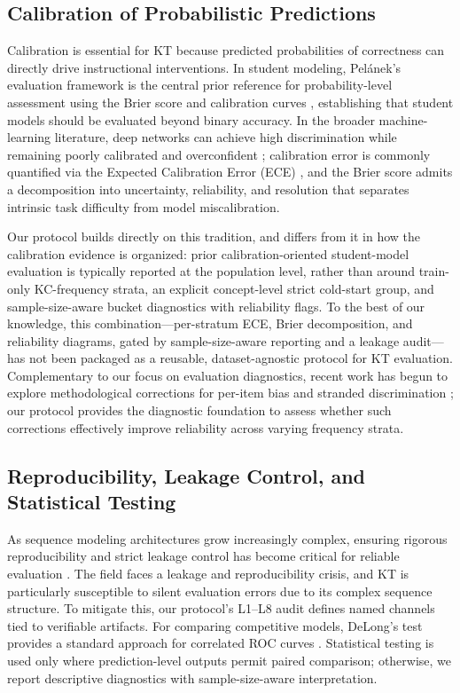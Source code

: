 \subsection{Calibration of Probabilistic Predictions}
Calibration is essential for KT because predicted probabilities of correctness can directly drive instructional interventions. In student modeling, Pel\'{a}nek's evaluation framework is the central prior reference for probability-level assessment using the Brier score and calibration curves \citep{pelanek2015metrics}, establishing that student models should be evaluated beyond binary accuracy. In the broader machine-learning literature, deep networks can achieve high discrimination while remaining poorly calibrated and overconfident \citep{guo2017calibration}; calibration error is commonly quantified via the Expected Calibration Error (ECE) \citep{naeini2015obtaining}, and the Brier score \citep{brier1950verification} admits a decomposition into uncertainty, reliability, and resolution \citep{degroot1983comparison} that separates intrinsic task difficulty from model miscalibration.

Our protocol builds directly on this tradition, and differs from it in how the calibration evidence is organized: prior calibration-oriented student-model evaluation is typically reported at the population level, rather than around train-only KC-frequency strata, an explicit concept-level strict cold-start group, and sample-size-aware bucket diagnostics with reliability flags. To the best of our knowledge, this combination---per-stratum ECE, Brier decomposition, and reliability diagrams, gated by sample-size-aware reporting and a leakage audit---has not been packaged as a reusable, dataset-agnostic protocol for KT evaluation. Complementary to our focus on evaluation diagnostics, recent work has begun to explore methodological corrections for per-item bias and stranded discrimination \citep{yan2026recovering}; our protocol provides the diagnostic foundation to assess whether such corrections effectively improve reliability across varying frequency strata.

\subsection{Reproducibility, Leakage Control, and Statistical Testing}
As sequence modeling architectures grow increasingly complex, ensuring rigorous reproducibility and strict leakage control has become critical for reliable evaluation \citep{kapoor2023leakage, gervet2020deep, kim2026ensuring}. The field faces a leakage and reproducibility crisis, and KT is particularly susceptible to silent evaluation errors due to its complex sequence structure. To mitigate this, our protocol's L1--L8 audit defines named channels tied to verifiable artifacts. For comparing competitive models, DeLong's test provides a standard approach for correlated ROC curves \citep{delong1988comparing}. Statistical testing is used only where prediction-level outputs permit paired comparison; otherwise, we report descriptive diagnostics with sample-size-aware interpretation.
